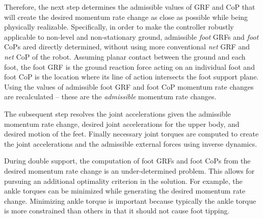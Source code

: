 \documentclass{llncs}
\begin{document}
Therefore, the next step determines the admissible values of GRF
and CoP that will create the desired momentum rate change as close
as possible while being physically realizable.
Specifically, in order to make the controller robustly applicable to non-level
and non-stationary ground, admissible \emph{foot} GRFs and \emph{foot} CoPs
ared directly determined,
without using more conventional \emph{net} GRF and \emph{net} CoP of the robot.
Assuming planar contact between the ground and each foot, the foot GRF is the ground
reaction force acting on an individual foot and foot CoP
is the location where its line of action intersects the foot
support plane.
Using the values of admissible foot GRF and foot CoP 
momentum rate changes are recalculated -- these are the \emph{admissible} momentum rate changes.

The subsequent step resolves the joint accelerations given
the admissible momentum rate change, desired joint accelerations for the upper body,
and desired motion of the feet.
Finally necessary joint torques are computed to create
the joint accelerations and the admissible external forces
using inverse dynamics.


During double support, the computation of foot GRFs and foot CoPs
from the desired momentum rate change is an under-determined problem. This
allows for pursuing an additional optimality criterion in the solution.
For example, the ankle torques can be minimized while generating
the desired momentum rate change.
Minimizing ankle torque is important because
typically the ankle torque is more constrained than
others in that it should not cause foot tipping.



\end{document}
